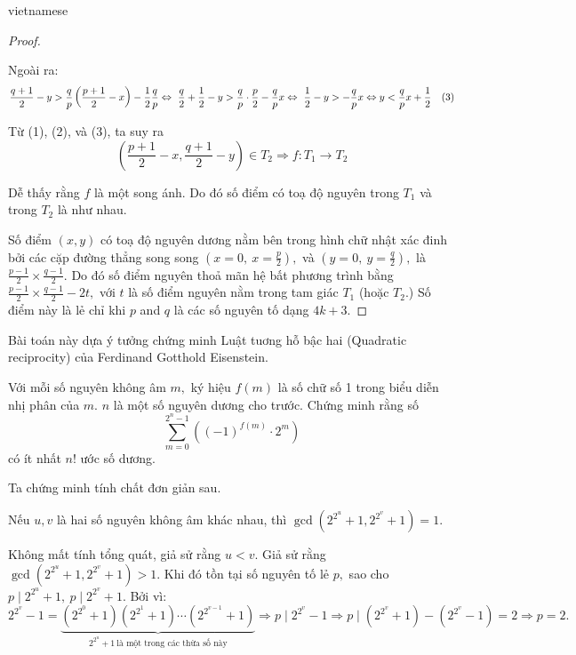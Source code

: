 \documentclass{article}
\begin{document}
\begin{otherlanguage*}{vietnamese}
\begin{proof}
\begin{subproof}
        Ngoài ra:
        \[
            \frac{q+1}{2} - y > \frac{q}{p} \left(\frac{p+1}{2} - x \right) - \frac{1}{2} \frac{q}{p}
            \Leftrightarrow\ \frac{q}{2} + \frac{1}{2} -y > \frac{q}{p}\cdot \frac{p}{2} - \frac{q}{p}x
            \Leftrightarrow\ \frac{1}{2} - y > -\frac{q}{p}x \Leftrightarrow y < \frac{q}{p} x + \frac{1}{2} \quad (3)
        \]

        Từ (1), (2), và (3), ta suy ra
        \[
            \left( \frac{p+1}{2} - x , \frac{q+1}{2} - y\right) \in T_2 \Rightarrow f: T_1 \rightarrow T_2
        \]
        
        Dễ thấy rằng $f$ là một song ánh. Do đó số điểm có toạ độ nguyên trong $T_1$ và trong $T_2$ là như nhau.
    \end{subproof}

    Số điểm $(x,y)$ có toạ độ nguyên dương nằm bên trong hình chữ nhật xác đinh bởi các cặp đường thẳng song song 
    $(x = 0,\ x = \frac{p}{2}),$ và $(y=0,\ y=\frac{q}{2}),$ là $\frac{p-1}{2} \times \frac{q-1}{2}.$ 
    Do đó số điểm nguyên thoả mãn hệ bất phương trình bằng $\frac{p-1}{2} \times \frac{q-1}{2} - 2t,$ với $t$ là số điểm nguyên nằm trong tam giác $T_1$ (hoặc $T_2.$)
    Số điểm này là lẻ chỉ khi $p$ and $q$ là các số nguyên tố dạng $4k+3.$
\end{proof}

\begin{remark*}
    Bài toán này dựa ý tưởng chứng minh Luật tuơng hỗ bậc hai (Quadratic reciprocity) của Ferdinand Gotthold Eisenstein.
\end{remark*}

\newpage

\begin{problem*}
    Với mỗi số nguyên không âm $m,$ ký hiệu $f(m)$ là số chữ số 1 trong biểu diễn nhị phân của $m.$ $n$ là một số nguyên dương cho trước.
    Chứng minh rằng số
    \[
        \sum_{m=0}^{2^n - 1} \left( (-1)^{f(m)} \cdot 2^m \right)
    \]
    có ít nhất $n!$ ước số dương.
\end{problem*}

\begin{soln}
    Ta chứng minh tính chất đơn giản sau.
    \begin{claim*}
        Nếu $u, v$ là hai số nguyên không âm khác nhau, thì $\gcd\left(2^{2^u}+1, 2^{2^v}+1\right) = 1.$
    \end{claim*}
    \begin{subproof}
        Không mất tính tổng quát, giả sử rằng $u < v$. Giả sử rằng $\gcd\left(2^{2^u}+1, 2^{2^v}+1\right) > 1.$
        Khi đó tồn tại số nguyên tố lẻ $p,$ sao cho $p \mid 2^{2^u}+1,\ p \mid 2^{2^v}+1.$ 
        Bởi vì:
        \[
            2^{2^v} - 1 = \underbrace{(2^{2^0} + 1)(2^{2^1} + 1) \cdots (2^{2^{v-1}} + 1)}_{2^{2^u}+1\ \text{là một trong các thừa số này}} 
            \Rightarrow p \mid  2^{2^v} - 1 \Rightarrow p \mid (2^{2^v}+1) - (2^{2^v} - 1) = 2 \Rightarrow p = 2.
        \]


\end{subproof}
\end{soln}
\end{otherlanguage*}
\end{document}
